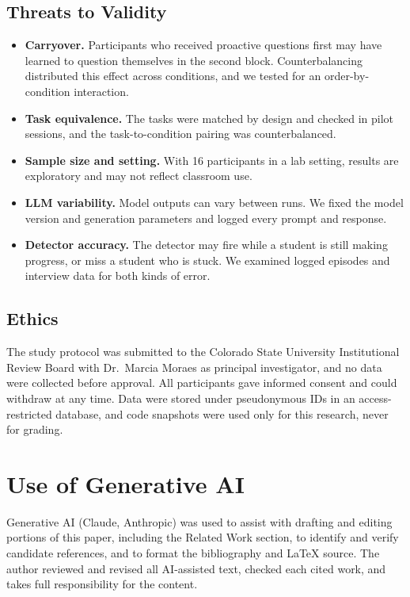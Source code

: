 \documentclass[manuscript,review]{acmart}
\begin{document}
\subsection{Threats to Validity}
\begin{itemize}
  \item \textbf{Carryover.} Participants who received proactive questions first may have learned to question themselves in the second block. Counterbalancing distributed this effect across conditions, and we tested for an order-by-condition interaction.
  \item \textbf{Task equivalence.} The tasks were matched by design and checked in pilot sessions, and the task-to-condition pairing was counterbalanced.
  \item \textbf{Sample size and setting.} With 16 participants in a lab setting, results are exploratory and may not reflect classroom use.
  \item \textbf{LLM variability.} Model outputs can vary between runs. We fixed the model version and generation parameters and logged every prompt and response.
  \item \textbf{Detector accuracy.} The detector may fire while a student is still making progress, or miss a student who is stuck. We examined logged episodes and interview data for both kinds of error.
\end{itemize}

\subsection{Ethics}
The study protocol was submitted to the Colorado State University Institutional Review Board with Dr.\ Marcia Moraes as principal investigator, and no data were collected before approval. All participants gave informed consent and could withdraw at any time. Data were stored under pseudonymous IDs in an access-restricted database, and code snapshots were used only for this research, never for grading.

\section*{Use of Generative AI}
Generative AI (Claude, Anthropic) was used to assist with drafting and editing portions of this paper, including the Related Work section, to identify and verify candidate references, and to format the bibliography and LaTeX source. The author reviewed and revised all AI-assisted text, checked each cited work, and takes full responsibility for the content.



\end{document}
